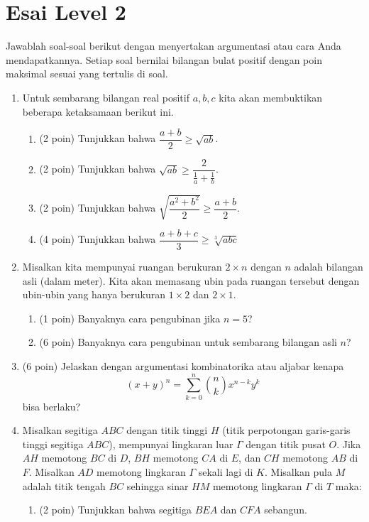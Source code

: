 \documentclass{article}
\begin{document}
\section{Esai Level 2}
Jawablah soal-soal berikut dengan menyertakan argumentasi atau cara Anda mendapatkannya. Setiap soal bernilai bilangan bulat positif dengan poin maksimal sesuai yang tertulis di soal.

\begin{enumerate}[resume]
	\item Untuk sembarang bilangan real positif $a,b,c$ kita akan membuktikan beberapa ketaksamaan berikut ini.
	\begin{enumerate}
		\item (2 poin) Tunjukkan bahwa $\dfrac{a+b}{2} \ge \sqrt{ab}$.
		
		\item (2 poin) Tunjukkan bahwa $\sqrt{ab} \ge \dfrac{2}{\frac{1}{a}+\frac{1}{b}}$.
		
		\item (2 poin) Tunjukkan bahwa $\sqrt{\dfrac{a^2+b^2}{2}} \ge \dfrac{a+b}{2}$.
		
		\item (4 poin) Tunjukkan bahwa $\dfrac{a+b+c}{3} \ge \sqrt[3]{abc}$\\
	
	\end{enumerate}

	\item Misalkan kita mempunyai ruangan berukuran $2 \times n$ dengan $n$ adalah bilangan asli (dalam meter). Kita akan memasang ubin pada ruangan tersebut dengan ubin-ubin yang hanya berukuran $1 \times 2$ dan $2 \times 1$.
	\begin{enumerate}
		\item (1 poin) Banyaknya cara pengubinan jika $n = 5$?
		\item (6 poin) Banyaknya cara pengubinan untuk sembarang bilangan asli $n$?
	\end{enumerate}

	\item (6 poin) Jelaskan dengan argumentasi kombinatorika atau aljabar kenapa $$(x+y)^n = \sum_{k=0}^{n} {n \choose k} x^{n-k}y^{k}$$ bisa berlaku?
	
	\item Misalkan segitiga $ABC$ dengan titik tinggi $H$ (titik perpotongan garis-garis tinggi segitiga $ABC$), mempunyai lingkaran luar $\Gamma$ dengan titik pusat $O$. Jika $AH$ memotong $BC$ di $D$, $BH$ memotong $CA$ di $E$, dan $CH$ memotong $AB$ di $F$. Misalkan $AD$ memotong lingkaran $\Gamma$ sekali lagi di $K$. Misalkan pula $M$ adalah titik tengah $BC$ sehingga sinar $HM$ memotong lingkaran $\Gamma$ di $T$ maka:
	\begin{enumerate}
		\item (2 poin) Tunjukkan bahwa segitiga $BEA$ dan $CFA$ sebangun.
		

\end{enumerate}
\end{enumerate}
\end{document}
